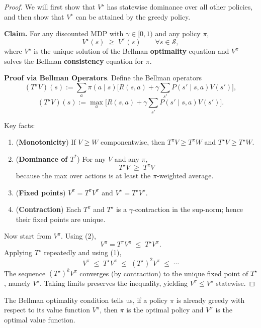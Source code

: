 \documentclass[
]{book}
\providecommand{\tightlist}{%
  \setlength{\itemsep}{0pt}\setlength{\parskip}{0pt}}
\theoremstyle{definition}
\theoremstyle{definition}
\theoremstyle{definition}
\theoremstyle{definition}
\theoremstyle{remark}
\begin{document}
\begin{proof}
We will first show that \(V^\star\) has statewise dominance over all other policies, and then show that \(V^\star\) can be attained by the greedy policy.

\textbf{Claim.} For any discounted MDP with \(\gamma \in [0,1)\) and any policy \(\pi\),
\[
V^\star(s) \;\ge\; V^{\pi}(s)\qquad \forall s\in\mathcal{S},
\]
where \(V^\star\) is the unique solution of the Bellman \textbf{optimality} equation and \(V^\pi\) solves the Bellman \textbf{consistency} equation for \(\pi\).

\textbf{Proof via Bellman Operators}.
Define the Bellman operators
\[
(T^\pi V)(s) := \sum_{a}\pi(a\mid s)\Big[ R(s,a)+\gamma \sum_{s'} P(s'\mid s,a)V(s') \Big],
\]
\[
(T^\star V)(s) := \max_{a}\Big[ R(s,a)+\gamma \sum_{s'} P(s'\mid s,a)V(s') \Big].
\]

Key facts:

\begin{enumerate}
\def\labelenumi{\arabic{enumi}.}
\tightlist
\item
  (\textbf{Monotonicity}) If \(V \ge W\) componentwise, then \(T^\pi V \ge T^\pi W\) and \(T^\star V \ge T^\star W\).
\item
  (\textbf{Dominance of \(T^*\)}) For any \(V\) and any \(\pi\),
  \[
  T^\star V \;\ge\; T^\pi V
  \]
  because the max over actions is at least the \(\pi\)-weighted average.
\item
  (\textbf{Fixed points}) \(V^\pi = T^\pi V^\pi\) and \(V^\star = T^\star V^\star\).
\item
  (\textbf{Contraction}) Each \(T^\pi\) and \(T^\star\) is a \(\gamma\)-contraction in the sup-norm; hence their fixed points are unique.
\end{enumerate}

Now start from \(V^\pi\). Using (2),
\[
V^\pi = T^\pi V^\pi \;\le\; T^\star V^\pi.
\]
Applying \(T^\star\) repeatedly and using (1),
\[
V^\pi \;\le\; T^\star V^\pi \;\le\; (T^\star)^2 V^\pi \;\le\; \cdots
\]
The sequence \((T^\star)^k V^\pi\) converges (by contraction) to the unique fixed point of \(T^\star\), namely \(V^\star\). Taking limits preserves the inequality, yielding \(V^\pi \le V^\star\) statewise.
\end{proof}

The Bellman optimality condition tells us, if a policy \(\pi\) is already greedy with respect to its value function \(V^\pi\), then \(\pi\) is the optimal policy and \(V^\pi\) is the optimal value function.
\end{document}
